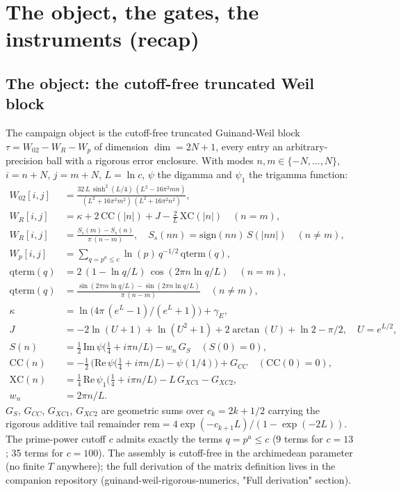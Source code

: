 \documentclass[11pt]{article}
\begin{document}
\section{The object, the gates, the instruments (recap)}

\subsection{The object: the cutoff-free truncated Weil block}
The campaign object is the cutoff-free truncated Guinand-Weil block
$\tau = W_{02} - W_R - W_p$ of dimension $\dim = 2N+1$, every entry an
arbitrary-precision ball with a rigorous error enclosure. With modes
$n, m \in \{-N, \ldots, N\}$, $i = n + N$, $j = m + N$, $L = \ln c$,
$\psi$ the digamma and $\psi_1$ the trigamma function:
\begin{align*}
W_{02}[i,j] &= \frac{32\,L\,\sinh^{2}(L/4)\,(L^{2} - 16\pi^{2} m n)}
{(L^{2} + 16\pi^{2} m^{2})\,(L^{2} + 16\pi^{2} n^{2})},\\
W_R[i,j] &= \kappa + 2\,\mathrm{CC}(|n|) + J - \tfrac{2}{L}\,\mathrm{XC}(|n|)
\quad (n = m),\\
W_R[i,j] &= \frac{S_s(m) - S_s(n)}{\pi\,(n - m)}, \quad
S_s(nn) = \mathrm{sign}(nn)\,S(|nn|) \quad (n \neq m),\\
W_p[i,j] &= \sum_{q = p^{a} \le c} \ln(p)\,q^{-1/2}\,\mathrm{qterm}(q),\\
\mathrm{qterm}(q) &= 2\,(1 - \ln q / L)\,\cos(2\pi n \ln q / L)
\quad (n = m),\\
\mathrm{qterm}(q) &= \frac{\sin(2\pi m \ln q / L) - \sin(2\pi n \ln q / L)}
{\pi\,(n - m)} \quad (n \neq m),\\
\kappa &= \ln\!\bigl(4\pi\,(e^{L} - 1)/(e^{L} + 1)\bigr) + \gamma_E,\\
J &= -2\ln(U + 1) + \ln(U^{2} + 1) + 2\arctan(U) + \ln 2 - \pi/2,
\quad U = e^{L/2},\\
S(n) &= \tfrac{1}{2}\,\mathrm{Im}\,\psi\!\bigl(\tfrac{1}{4} + i\pi n / L\bigr)
- w_n\,G_S \quad (S(0) = 0),\\
\mathrm{CC}(n) &= -\tfrac{1}{2}\,\bigl(\mathrm{Re}\,\psi\!\bigl(\tfrac{1}{4}
+ i\pi n / L\bigr) - \psi(1/4)\bigr) + G_{CC} \quad (\mathrm{CC}(0) = 0),\\
\mathrm{XC}(n) &= \tfrac{1}{4}\,\mathrm{Re}\,\psi_1\!\bigl(\tfrac{1}{4}
+ i\pi n / L\bigr) - L\,G_{XC1} - G_{XC2},\\
w_n &= 2\pi n / L.
\end{align*}
$G_S$, $G_{CC}$, $G_{XC1}$, $G_{XC2}$ are geometric sums over
$c_k = 2k + 1/2$ carrying the rigorous additive tail remainder
$\mathrm{rem} = 4\exp(-c_{k+1} L)/(1 - \exp(-2L))$. The prime-power
cutoff $c$ admits exactly the terms $q = p^{a} \le c$ (9 terms for
$c = 13$; 35 terms for $c = 100$). The assembly is cutoff-free in the
archimedean parameter (no finite $T$ anywhere); the full derivation of
the matrix definition lives in the companion repository
(guinand-weil-rigorous-numerics, "Full derivation" section).
\end{document}
